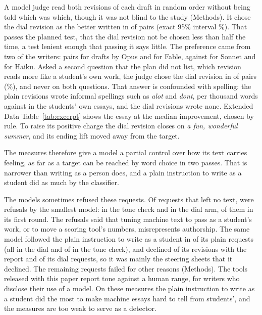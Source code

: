 {A model judge read both revisions of each draft in random order without being told which was which, though it was not blind to the study (Methods). It chose the dial revision as the better written in \dlJudgeWins{} of \dlJudgeN{} pairs (exact 95\% interval \dlJudgeExact\%). That passes the planned test, that the dial revision not be chosen less than half the time, a test lenient enough that passing it says little. The preference came from two of the writers: \dlJudgeOpus{} pairs for drafts by Opus and \dlJudgeFable{} for Fable, against \dlJudgeSonnet{} for Sonnet and \dlJudgeHaiku{} for Haiku. Asked a second question that the plan did not list, which revision reads more like a student's own work, the judge chose the dial revision in \dlJudgeStudentWins{} of \dlJudgeN{} pairs (\dlJudgeStudentExact\%), and never on both questions. That answer is confounded with spelling: the plain revisions wrote informal spellings such as \emph{alot} and \emph{dont}, \dlSlipsControl{} per thousand words against \dlSlipsHuman{} in the students' own essays, and the dial revisions wrote none. Extended Data Table~\ref{tab:excerpt} shows the essay at the median improvement, chosen by rule. To raise its positive charge the dial revision closes on \emph{a fun, wonderful summer}, and its ending lift moved away from the target.

The measures therefore give a model a partial control over how its text carries feeling, as far as a target can be reached by word choice in two passes. That is narrower than writing as a person does, and a plain instruction to write as a student did as much by the classifier.

The models sometimes refused these requests. Of \dcTotal{} requests that left no text, \dcAuthorship{} were refusals by the smallest model: \rvDeclined{} in the tone check and \dlMissing{} in the dial arm, \dcDialFirst{} of them in its first round. The refusals said that tuning machine text to pass as a student's work, or to move a scoring tool's numbers, misrepresents authorship. The same model followed the plain instruction to write as a student in \hkControlDone{} of its \hkControlAll{} plain requests (all \hkControlDial{} in the dial and \hkToneControlDone{} of \hkToneControl{} in the tone check), and declined \hkReportDeclined{} of its \hkReport{} revisions with the report and \dlMissingHaiku{} of its \hkDialRequests{} dial requests, so it was mainly the steering sheets that it declined. The remaining requests failed for other reasons (Methods). The tools released with this paper report tone against a human range, for writers who disclose their use of a model. On these measures the plain instruction to write as a student did the most to make machine essays hard to tell from students', and the measures are too weak to serve as a detector.}
